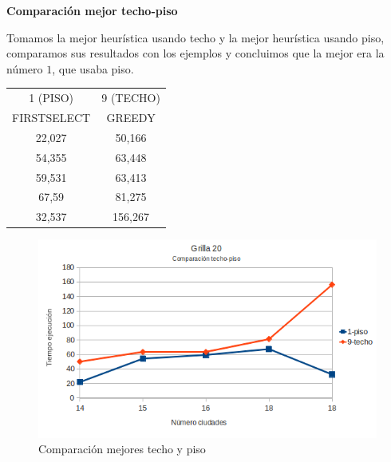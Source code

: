 \documentclass[10pt]{article}
\begin{document}
\newpage
\textbf{Comparación mejor techo-piso}

Tomamos la mejor heurística usando techo y la mejor heurística usando piso, comparamos sus resultados con los ejemplos y concluimos que la mejor era la número $1$, que usaba piso.\\


 
\begin{table}[ht]
\begin{minipage}[b]{1\linewidth}
 \centering
    \begin{tabular}{|c|c|}
        \hline
        1 (PISO)                         & 9 (TECHO)         \\ 
        FIRSTSELECT                      & GREEDY            \\ \hline
        22,027                           & 50,166              \\ \hline
        54,355                           & 63,448             \\ \hline
        59,531                           & 63,413             \\ \hline
        67,59                            & 81,275             \\ \hline
        32,537                           & 156,267             \\
        \hline
    \end{tabular}
    \end{minipage}
\end{table}


\begin{figure}[ht]
\begin{minipage}[b]{1\linewidth}
 \centering
 \includegraphics[scale=0.4]{grilla20ceilfloor.png}
 \caption{Comparación mejores techo y piso}
 \label{fig:grid20ceilfloor}
 \end{minipage}
\end{figure}
\end{document}
